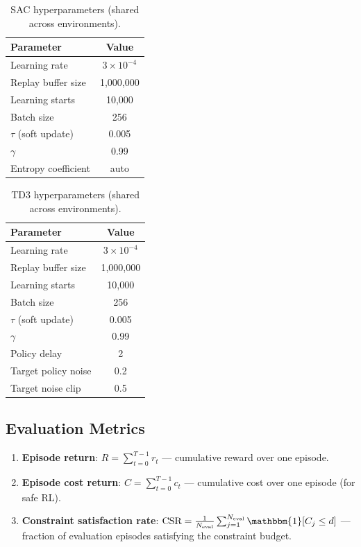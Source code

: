 \begin{table}[htbp]
\centering
\caption{SAC hyperparameters (shared across environments).}
\label{tab:sac_hyper}
\begin{tabular}{@{}lc@{}}
\toprule
\textbf{Parameter} & \textbf{Value} \\
\midrule
Learning rate & $3{\times}10^{-4}$ \\
Replay buffer size & 1,000,000 \\
Learning starts & 10,000 \\
Batch size & 256 \\
$\tau$ (soft update) & 0.005 \\
$\gamma$ & 0.99 \\
Entropy coefficient & auto \\
\bottomrule
\end{tabular}
\end{table}

\begin{table}[htbp]
\centering
\caption{TD3 hyperparameters (shared across environments).}
\label{tab:td3_hyper}
\begin{tabular}{@{}lc@{}}
\toprule
\textbf{Parameter} & \textbf{Value} \\
\midrule
Learning rate & $3{\times}10^{-4}$ \\
Replay buffer size & 1,000,000 \\
Learning starts & 10,000 \\
Batch size & 256 \\
$\tau$ (soft update) & 0.005 \\
$\gamma$ & 0.99 \\
Policy delay & 2 \\
Target policy noise & 0.2 \\
Target noise clip & 0.5 \\
\bottomrule
\end{tabular}
\end{table}

\subsection{Evaluation Metrics}
\label{sec:eval_metrics}

\begin{definition}\label{def:primary_metrics}
\hfill
\begin{enumerate}
    \item \textbf{Episode return}: $R = \sum_{t=0}^{T-1} r_t$ --- cumulative reward over one episode.
    \item \textbf{Episode cost return}: $C = \sum_{t=0}^{T-1} c_t$ --- cumulative cost over one episode (for safe RL).
    \item \textbf{Constraint satisfaction rate}: $\text{CSR} = \frac{1}{N_{\text{eval}}} \sum_{j=1}^{N_{\text{eval}}} \mathbbm{1}[C_j \leq d]$ --- fraction of evaluation episodes satisfying the constraint budget.
\end{enumerate}
\end{definition}

